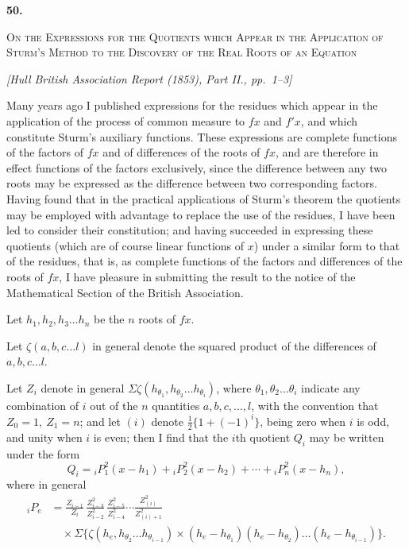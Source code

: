 \documentclass[11pt]{article}
\newcommand{\paperhead}[3]{%
  \clearpage
  \begin{center}
  {\Large\bfseries #1.}\par\vspace{0.85em}
  {\large\scshape #2}\par\vspace{0.6em}
  {\itshape [#3]}\par
  \end{center}\vspace{0.4em}}
\newcommand{\sourcepage}[1]{\marginpar{\scriptsize p.~#1}}
\begin{document}
{{\paperhead{50}{On the Expressions for the Quotients which Appear in the Application of Sturm's Method to the Discovery of the Real Roots of an Equation}{Hull British Association Report (1853), Part II., pp.~1--3}

\sourcepage{396}
Many years ago I published expressions for the residues which appear in the application of the process of common measure to $fx$ and $f'x$, and which constitute Sturm's auxiliary functions. These expressions are complete functions of the factors of $fx$ and of differences of the roots of $fx$, and are therefore in effect functions of the factors exclusively, since the difference between any two roots may be expressed as the difference between two corresponding factors. Having found that in the practical applications of Sturm's theorem the quotients may be employed with advantage to replace the use of the residues, I have been led to consider their constitution; and having succeeded in expressing these quotients (which are of course linear functions of $x$) under a similar form to that of the residues, that is, as complete functions of the factors and differences of the roots of $fx$, I have pleasure in submitting the result to the notice of the Mathematical Section of the British Association.

Let $h_1,h_2,h_3\ldots h_n$ be the $n$ roots of $fx$.

Let $\zeta(a,b,c\ldots l)$ in general denote the squared product of the differences of $a,b,c\ldots l$.

Let $Z_i$ denote in general $\Sigma\zeta(h_{\theta_1},h_{\theta_2}\ldots h_{\theta_i})$, where $\theta_1,\theta_2\ldots\theta_i$ indicate any combination of $i$ out of the $n$ quantities $a,b,c,\ldots,l$, with the convention that $Z_0=1,\ Z_1=n$; and let $(i)$ denote $\frac12\{1+(-1)^i\}$, being zero when $i$ is odd, and unity when $i$ is even; then I find that the $i$th quotient $Q_i$ may be written under the form
\[
Q_i={}_iP_1^2(x-h_1)+{}_iP_2^2(x-h_2)+\cdots+{}_iP_n^2(x-h_n),
\]
where in general
\[
\begin{aligned}
{}_iP_e&=
\frac{Z_{i-1}}{Z_i}\,
\frac{Z^2_{i-3}}{Z^2_{i-2}}\,
\frac{Z^2_{i-5}}{Z^2_{i-4}}\cdots
\frac{Z^2_{(i)}}{Z^2_{(i)+1}}\\
&\quad{}\times
\Sigma\{\zeta(h_e,h_{\theta_2}\ldots h_{\theta_{i-1}})\times
(h_e-h_{\theta_1})(h_e-h_{\theta_2})\ldots(h_e-h_{\theta_{i-1}})\}.
\end{aligned}
\]

}}
\end{document}
